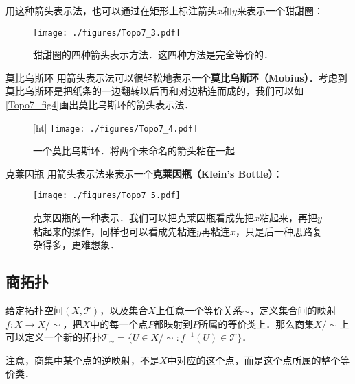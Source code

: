 用这种箭头表示法，也可以通过在矩形上标注箭头$x$和$y$来表示一个甜甜圈：

\begin{figure}[ht]
\centering
\texttt{[image: ./figures/Topo7\_3.pdf]}
\caption{甜甜圈的四种箭头表示方法．这四种方法是完全等价的．} \label{Topo7_fig3}
\end{figure}

\begin{example}{莫比乌斯环}
用箭头表示法可以很轻松地表示一个\textbf{莫比乌斯环（Mobius）}．考虑到莫比乌斯环是把纸条的一边翻转以后再和对边粘连而成的，我们可以如\autoref{Topo7_fig4}画出莫比乌斯环的箭头表示法．

\begin{figure}\label{Topo7_fig6}[ht]
\centering
\texttt{[image: ./figures/Topo7\_4.pdf]}
\caption{一个莫比乌斯环．将两个未命名的箭头粘在一起} \label{Topo7_fig4}
\end{figure}

\end{example}



\begin{example}{克莱因瓶}
用箭头表示法来表示一个\textbf{克莱因瓶（Klein's Bottle）}：
\begin{figure}[ht]
\centering
\texttt{[image: ./figures/Topo7\_5.pdf]}
\caption{克莱因瓶的一种表示．我们可以把克莱因瓶看成先把$x$粘起来，再把$y$粘起来的操作，同样也可以看成先粘连$y$再粘连$x$，只是后一种思路复杂得多，更难想象．} \label{Topo7_fig5}
\end{figure}

\end{example}



\subsection{商拓扑}

给定拓扑空间$(X, \mathcal{T})$，以及集合$X$上任意一个等价关系$\sim$，定义集合间的映射$f:X\rightarrow X/\sim$，把$X$中的每一个点$P$都映射到$P$所属的等价类上．那么商集$X/\sim$上可以定义一个新的拓扑$\mathcal{T}_\sim=\{U\in X/\sim: f^{-1}(U)\in\mathcal{T}\}$．

注意，商集中某个点的逆映射，不是$X$中对应的这个点，而是这个点所属的整个等价类．

